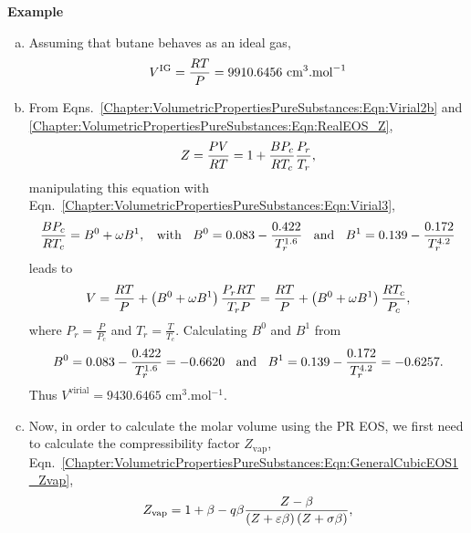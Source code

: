 \begin{MyExample}{\begin{center}{\bf Example}\end{center}}
           \begin{enumerate}[a)]
%
               \item Assuming that butane behaves as an ideal gas,
                    \begin{displaymath}
                        V^{\text{IG}} = \displaystyle\frac{RT}{P} = 9910.6456 \text{ cm}^{3}.\text{mol}^{-1}
                    \end{displaymath}
%
               \item From Eqns.~\ref{Chapter:VolumetricPropertiesPureSubstances:Eqn:Virial2b} and \ref{Chapter:VolumetricPropertiesPureSubstances:Eqn:RealEOS_Z},
                  \begin{displaymath}
                     Z = \displaystyle\frac{P V}{R T} = 1 + \displaystyle\frac{B P_{c}}{R T_{c}}\displaystyle\frac{P_{r}}{T_{r}},
                  \end{displaymath}
                  manipulating this equation with Eqn.~\ref{Chapter:VolumetricPropertiesPureSubstances:Eqn:Virial3},
                  \begin{displaymath}
                     \displaystyle\frac{B P_{c}}{R T_{c}} = B^{0} + \omega B^{1},\;\;\text{ with }\;\;B^{0} = 0.083 - \displaystyle\frac{0.422}{T_{r}^{1.6}}\;\;\text{ and }\;\; B^{1} = 0.139 - \displaystyle\frac{0.172}{T_{r}^{4.2}}
                  \end{displaymath}
                  leads to
                  \begin{displaymath}
                     V = \displaystyle\frac{R T}{P} + \left(B^{0} + \omega B^{1}\right) \displaystyle\frac{P_{r}R T}{T_{r}P} = \displaystyle\frac{R T}{P} + \left(B^{0} + \omega B^{1}\right)\displaystyle\frac{RT_{c}}{P_{c}},
                  \end{displaymath}
                  where $P_{r}=\frac{P}{P_{c}}$ and $T_{r}=\frac{T}{T_{c}}$. Calculating $B^{0}$ and $B^{1}$ from
                  \begin{displaymath}
                     B^{0} = 0.083 - \displaystyle\frac{0.422}{T_{r}^{1.6}} = -0.6620\;\;\text{ and }\;\; B^{1} = 0.139 - \displaystyle\frac{0.172}{T_{r}^{4.2}}=-0.6257.
                  \end{displaymath}
                  Thus $V^{\text{virial}} = 9430.6465$ cm$^{3}$.mol$^{-1}$.
%
               \item Now, in order to calculate the molar volume using the PR EOS, we first need to calculate the compressibility factor $Z_{\text{vap}}$, Eqn.~\ref{Chapter:VolumetricPropertiesPureSubstances:Eqn:GeneralCubicEOS1_Zvap},
                  \begin{displaymath}
                     Z_{\text{vap}} = 1 + \beta - q\beta \frc{Z - \beta} {\left(Z+\varepsilon\beta\right)\left(Z+\sigma\beta\right)},

\end{displaymath}
\end{enumerate}
\end{MyExample}
